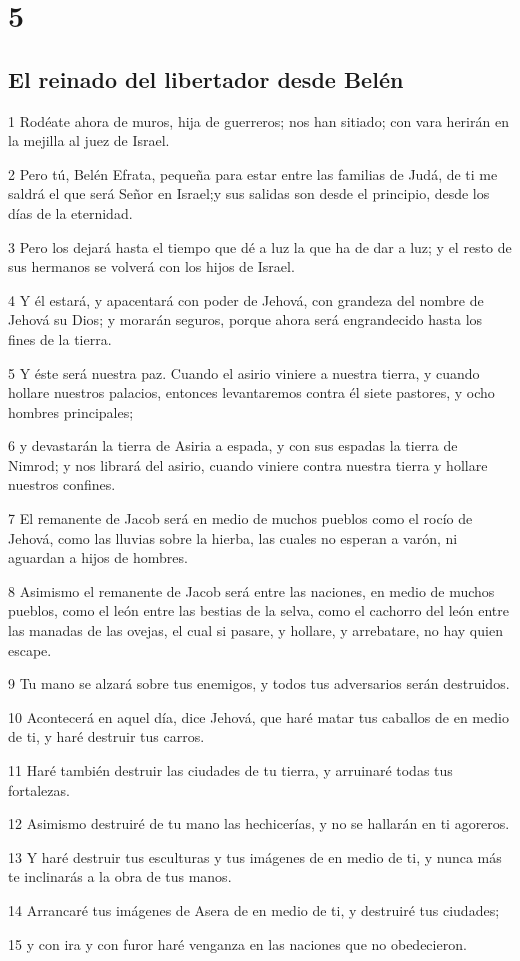\chapter{5}

\section*{El reinado del libertador desde Belén}

\par 1 Rodéate ahora de muros, hija de guerreros; nos han sitiado; con vara herirán en la mejilla al juez de Israel.
\par 2 Pero tú, Belén Efrata, pequeña para estar entre las familias de Judá, de ti me saldrá el que será Señor en Israel;y sus salidas son desde el principio, desde los días de la eternidad.
\par 3 Pero los dejará hasta el tiempo que dé a luz la que ha de dar a luz; y el resto de sus hermanos se volverá con los hijos de Israel.
\par 4 Y él estará, y apacentará con poder de Jehová, con grandeza del nombre de Jehová su Dios; y morarán seguros, porque ahora será engrandecido hasta los fines de la tierra.
\par 5 Y éste será nuestra paz. Cuando el asirio viniere a nuestra tierra, y cuando hollare nuestros palacios, entonces levantaremos contra él siete pastores, y ocho hombres principales;
\par 6 y devastarán la tierra de Asiria a espada, y con sus espadas la tierra de Nimrod; y nos librará del asirio, cuando viniere contra nuestra tierra y hollare nuestros confines.
\par 7 El remanente de Jacob será en medio de muchos pueblos como el rocío de Jehová, como las lluvias sobre la hierba, las cuales no esperan a varón, ni aguardan a hijos de hombres.
\par 8 Asimismo el remanente de Jacob será entre las naciones, en medio de muchos pueblos, como el león entre las bestias de la selva, como el cachorro del león entre las manadas de las ovejas, el cual si pasare, y hollare, y arrebatare, no hay quien escape.
\par 9 Tu mano se alzará sobre tus enemigos, y todos tus adversarios serán destruidos.
\par 10 Acontecerá en aquel día, dice Jehová, que haré matar tus caballos de en medio de ti, y haré destruir tus carros.
\par 11 Haré también destruir las ciudades de tu tierra, y arruinaré todas tus fortalezas.
\par 12 Asimismo destruiré de tu mano las hechicerías, y no se hallarán en ti agoreros.
\par 13 Y haré destruir tus esculturas y tus imágenes de en medio de ti, y nunca más te inclinarás a la obra de tus manos.
\par 14 Arrancaré tus imágenes de Asera de en medio de ti, y destruiré tus ciudades;
\par 15 y con ira y con furor haré venganza en las naciones que no obedecieron.


